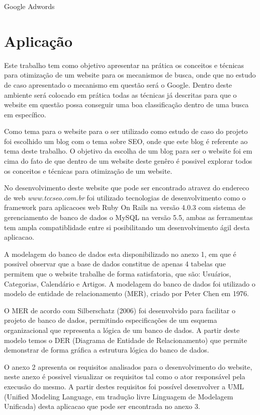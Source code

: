 \documentclass[
	12pt,				%
	openright,			%
	twoside,			%
	a4paper,			%
	english,			%
	french,				%
	spanish,			%
	brazil				%
	]{abntex2}
\begin{document}
Google Adwords

\chapter{Aplicação}

Este trabalho tem como objetivo apresentar na prática os conceitos e técnicas para otimização de um website para os mecanismos de busca, onde que no estudo de caso apresentado o mecanismo em questão será o Google. Dentro deste ambiente será colocado em prática todas as técnicas já descritas para que o website em questão possa conseguir uma boa classificação dentro de uma busca em específico.

Como tema para o website para o ser utilizado como estudo de caso do projeto foi escolhido um blog com o tema sobre SEO, onde que este blog é referente ao tema deste trabalho. O objetivo da escolha de um blog para ser o website foi em cima do fato de que dentro de um website deste genêro é possivel explorar todos os conceitos e técnicas para otimização de um website.

No desenvolvimento deste website que pode ser encontrado atravez do endereco de web \textit{www.tccseo.com.br} foi utilizado  tecnologias de desenvolvimento como o framework para aplicacoes web Ruby On Rails na versão 4.0.3 com sistema de gerenciamento de banco de dados o MySQL na versão 5.5, ambas as ferramentas tem ampla compatiblidade entre si posibilitando um desenvolvimento ágil desta aplicacao.

A modelagem do banco de dados esta disponibilizado no anexo 1, em que é possivel observar que a base de dados constitue de apenas 4 tabelas que permitem que o website trabalhe de forma satisfatoria, que são: Usuários, Categorias, Calendário e Artigos. A modelagem do banco de dados foi utilizado o modelo de entidade de relacionamento (MER), criado por Peter Chen em 1976. 

O MER de acordo com Silberschatz (2006) foi desenvolvido para facilitar o projeto de banco de dados, permitindo especificações de um esquema organizacional que representa a lógica de um banco de dados. A partir deste modelo temos o DER (Diagrama de Entidade de Relacionamento) que permite demonstrar de forma gráfica a estrutura lógica do banco de dados.

O anexo 2 apresenta os requisitos analisados para o desenvolvimento do website, neste anexo é possivel visualizar os requisitos tal como o ator responsável pela execusão do mesmo. A partir destes requisitos foi possível desenvolver a UML (Unified Modeling Language, em tradução livre Linguagem de Modelagem Unificada) desta aplicacao que pode ser encontrada no anexo 3.
\end{document}
